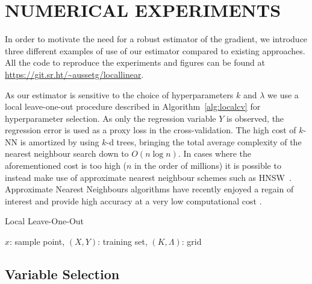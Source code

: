 \section{NUMERICAL EXPERIMENTS}\label{sec:exp}

In order to motivate the need for a robust estimator of the gradient, we introduce three different examples of use of our estimator compared to existing approaches. All the code to reproduce the experiments and figures can be found at \url{https://git.sr.ht/~aussetg/locallinear}.

As our estimator is sensitive to the choice of hyperparameters $k$ and $\lambda$ we use a local leave-one-out procedure described in Algorithm~\ref{alg:localcv} for hyperparameter selection. As only the regression variable $Y$ is observed, the regression error is used as a proxy loss in the cross-validation. 
The high cost of $k$-NN is amortized by using $k$-d trees, bringing the total average complexity of the nearest neighbour search down to $O(n \log n)$. In cases where the aforementioned cost is too high ($n$ in the order of millions) it is possible to instead make use of approximate nearest neighbour schemes such as HNSW~\citep{malkovEfficientRobustApproximate2020}. Approximate Nearest Neighbours algorithms have recently enjoyed a regain of interest and provide high accuracy at a very low computational cost \citep{aumullerANNBenchmarksBenchmarkingTool2018}.
\begin{algorithm}
    \caption{Local Leave-One-Out}\label{alg:localcv}
    \begin{algorithmic}[1] %
        \Require $x$: sample point, $(X, Y)$: training set, $(K, \Lambda)$: grid
            \EndFor
        \EndFor
    \end{algorithmic}
\end{algorithm}





\subsection{Variable Selection}

